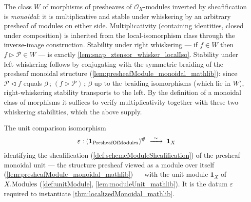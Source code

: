 \begin{definition}
  \label{def:W_isMonoidal}
  The class \(W\) of morphisms of presheaves of \(\mathcal{O}_X\)-modules inverted
  by sheafification is \emph{monoidal}: it is multiplicative and stable under
  whiskering by an arbitrary presheaf of modules on either side.
  Multiplicativity (containing identities, closed under composition) is inherited
  from the local-isomorphism class through the inverse-image construction. Stability under right
  whiskering --- if \(f \in W\) then \(f \rhd \mathcal{P} \in W\) --- is exactly
  \cref{lem:snap_ztensor_whisker_localIso}. Stability under left
  whiskering follows by conjugating with the symmetric braiding of the presheaf
  monoidal structure (\cref{lem:presheafModule_monoidal_mathlib}): since
  \(\mathcal{P} \lhd f\) equals \(\beta \,;\, (f \rhd \mathcal{P}) \,;\, \beta\) up
  to the braiding isomorphisms (which lie in \(W\)), right-whiskering stability
  transports to the left. By the definition of a monoidal class of morphisms it suffices
  to verify multiplicativity together with these two whiskering stabilities, which
  the above supply.
\end{definition}

\begin{definition}
  \label{def:localizedMonoidalUnitIso}
  The unit comparison isomorphism
  \[
    \varepsilon :
      (\mathbf{1}_{\mathrm{PresheafOfModules}})^{\#}
      \;\xrightarrow{\ \sim\ }\; \mathbf{1}_X
  \]
  identifying the sheafification (\cref{def:schemeModuleSheafification}) of the
  presheaf monoidal unit --- the structure presheaf viewed as a module over itself
  (\cref{lem:presheafModule_monoidal_mathlib}) --- with the unit module
  \(\mathbf{1}_X\) of \(X.\mathrm{Modules}\) (\cref{def:unitModule},
  \cref{lem:moduleUnit_mathlib}). It is the datum \(\varepsilon\) required to
  instantiate \cref{thm:localizedMonoidal_mathlib}.
\end{definition}

